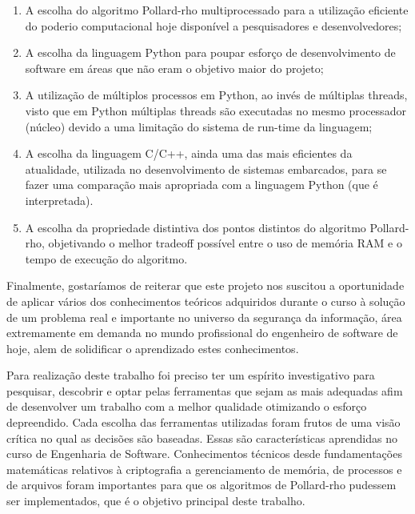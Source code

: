 \begin{enumerate}
\item A escolha do algoritmo Pollard-rho multiprocessado para a utilização eficiente do poderio computacional hoje disponível a pesquisadores e desenvolvedores;

\item A escolha da linguagem Python para poupar esforço de desenvolvimento de
software em áreas que não eram o objetivo maior do projeto;

\item A utilização de múltiplos processos em Python, ao invés de múltiplas threads, visto que em Python múltiplas threads são executadas no mesmo processador (núcleo) devido a uma limitação do sistema de run-time da linguagem;

\item A escolha da linguagem C/C++, ainda uma das mais eficientes da atualidade, utilizada no desenvolvimento de sistemas embarcados, para se fazer uma comparação mais apropriada com a linguagem Python (que é interpretada).

\item A escolha da propriedade distintiva dos pontos distintos do algoritmo Pollard-rho, objetivando o melhor tradeoff possível entre o uso de memória RAM e o tempo de execução do algoritmo.
\end{enumerate}

Finalmente, gostaríamos de reiterar que este projeto nos suscitou a oportunidade de aplicar vários dos conhecimentos teóricos adquiridos durante o curso à solução de um problema real e importante no universo da segurança da informação, área extremamente em demanda no mundo profissional do engenheiro de software de hoje, alem de solidificar o aprendizado estes conhecimentos.

Para realização deste trabalho foi preciso ter um espírito investigativo para pesquisar, descobrir e optar pelas ferramentas que sejam as mais adequadas afim de desenvolver um trabalho com a melhor qualidade otimizando o esforço depreendido. Cada escolha das ferramentas utilizadas foram frutos de uma visão crítica no qual as decisões são baseadas. Essas são características aprendidas no curso de Engenharia de Software. Conhecimentos técnicos desde fundamentações matemáticas relativos à criptografia a gerenciamento de memória, de processos e de arquivos foram importantes para que os algoritmos de Pollard-rho pudessem ser implementados, que é o objetivo principal deste trabalho.


